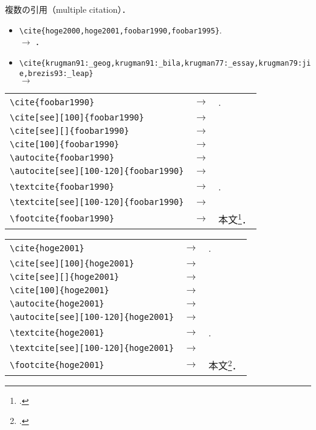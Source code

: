 複数の引用（multiple citation）．
\begin{itemize}
 \item \verb|\cite{hoge2000,hoge2001,foobar1990,foobar1995}|. \\
       $\rightarrow$ \cite{hoge2000,hoge2001,foobar1990,foobar1995}．
 \item \verb|\cite{krugman91:_geog,krugman91:_bila,krugman77:_essay,krugman79:jie,brezis93:_leap}| \\
       $\rightarrow$ \cite{krugman91:_geog,krugman91:_bila,krugman77:_essay,krugman79:jie,brezis93:_leap}
\end{itemize}

\begin{tabular}{lll}
\verb|\cite{foobar1990}| & $\rightarrow$ &  \cite{foobar1990}. \\
\verb|\cite[see][100]{foobar1990}| & $\rightarrow$ &  \cite[see][100]{foobar1990} \\
\verb|\cite[see][]{foobar1990}| & $\rightarrow$ &  \cite[see][]{foobar1990} \\
\verb|\cite[100]{foobar1990}| & $\rightarrow$ &  \cite[100]{foobar1990} \\
\verb|\autocite{foobar1990}| & $\rightarrow$ &  \autocite{foobar1990} \\
\verb|\autocite[see][100-120]{foobar1990}| & $\rightarrow$ &  \autocite[see][100-120]{foobar1990} \\
\verb|\textcite{foobar1990}| & $\rightarrow$ &  \textcite{foobar1990}. \\
\verb|\textcite[see][100-120]{foobar1990}| & $\rightarrow$ &  \textcite[see][100-120]{foobar1990} \\
\verb|\footcite{foobar1990}| & $\rightarrow$ &  本文\footcite{foobar1990}． \\
\end{tabular}

\begin{tabular}{lll}
\verb|\cite{hoge2001}| & $\rightarrow$ &  \cite{hoge2001}. \\
\verb|\cite[see][100]{hoge2001}| & $\rightarrow$ &  \cite[see][100]{hoge2001} \\
\verb|\cite[see][]{hoge2001}| & $\rightarrow$ &  \cite[see][]{hoge2001} \\
\verb|\cite[100]{hoge2001}| & $\rightarrow$ &  \cite[100]{hoge2001} \\
\verb|\autocite{hoge2001}| & $\rightarrow$ &  \autocite{hoge2001} \\
\verb|\autocite[see][100-120]{hoge2001}| & $\rightarrow$ &  \autocite[see][100-120]{hoge2001} \\
\verb|\textcite{hoge2001}| & $\rightarrow$ &  \textcite{hoge2001}. \\
\verb|\textcite[see][100-120]{hoge2001}| & $\rightarrow$ &  \textcite[see][100-120]{hoge2001} \\
\verb|\footcite{hoge2001}| & $\rightarrow$ &  本文\footcite{hoge2001}． \\
\end{tabular}

